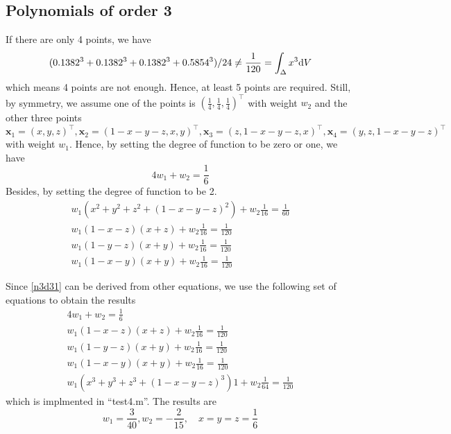 \documentclass[conference,onecolumn, 12pt]{IEEEtran}
\begin{document}
\subsection{Polynomials of order 3}
If there are only 4 points, we have 
\begin{equation*}
    (0.1382^3+0.1382^3+0.1382^3+0.5854^3)/24\neq \frac{1}{120}=\int_{\Delta} x^3 {\rm d}V
\end{equation*}
which means 4 points are not enough. Hence, at least 5 points are required. Still, by symmetry, we assume one of the points is $(\frac{1}{4},\frac{1}{4},\frac{1}{4})^\top$ with weight $w_2$ and the other three points
\begin{equation}
    \mathbf{x}_1=(x,y,z)^\top,\mathbf{x}_2=(1-x-y-z,x,y)^\top, \mathbf{x}_3=(z,1-x-y-z,x)^\top,\mathbf{x}_4=(y,z,1-x-y-z)^\top
\end{equation}
with weight $w_1$. Hence, by setting the degree of function to be zero or one, we have
\begin{equation}
4w_1+w_2=\frac{1}{6}
\end{equation}
Besides, by setting the degree of function to be 2.
\begin{subequations}
    \begin{align}
        w_1(x^2+y^2+z^2+(1-x-y-z)^2)+w_2\frac{1}{16}=\frac{1}{60}\label{n3d31}\\
        w_1(1-x-z)(x+z)+w_2\frac{1}{16}=\frac{1}{120}\\ 
        w_1(1-y-z)(x+y)+w_2\frac{1}{16}=\frac{1}{120}\\
        w_1(1-x-y)(x+y)+w_2\frac{1}{16}=\frac{1}{120}
    \end{align}
\end{subequations}

Since \ref{n3d31} can be derived from other equations, we use the following set of equations to obtain the results
\begin{subequations}
    \begin{align}
        4w_1+w_2=\frac{1}{6}\\
        w_1(1-x-z)(x+z)+w_2\frac{1}{16}=\frac{1}{120}\\ 
        w_1(1-y-z)(x+y)+w_2\frac{1}{16}=\frac{1}{120}\\
        w_1(1-x-y)(x+y)+w_2\frac{1}{16}=\frac{1}{120}\\
        w_1(x^3+y^3+z^3+(1-x-y-z)^3)1+w_2\frac{1}{64}=\frac{1}{120}
    \end{align}
\end{subequations}
which is implmented in ``test4.m''. The results are
\begin{equation}
    w_1=\frac{3}{40},w_2=-\frac{2}{15},\quad x=y=z=\frac{1}{6}
\end{equation}
\end{document}
